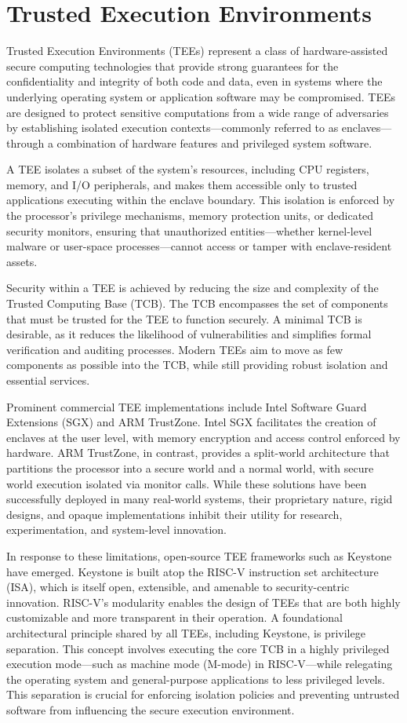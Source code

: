 \section{Trusted Execution Environments}
Trusted Execution Environments (TEEs) represent a class of hardware-assisted secure computing technologies that provide strong guarantees for the confidentiality and integrity of both code and data, even in systems where the underlying operating system or application software may be compromised. TEEs are designed to protect sensitive computations from a wide range of adversaries by establishing isolated execution contexts—commonly referred to as enclaves—through a combination of hardware features and privileged system software.

A TEE isolates a subset of the system’s resources, including CPU registers, memory, and I/O peripherals, and makes them accessible only to trusted applications executing within the enclave boundary. This isolation is enforced by the processor’s privilege mechanisms, memory protection units, or dedicated security monitors, ensuring that unauthorized entities—whether kernel-level malware or user-space processes—cannot access or tamper with enclave-resident assets.

Security within a TEE is achieved by reducing the size and complexity of the Trusted Computing Base (TCB). The TCB encompasses the set of components that must be trusted for the TEE to function securely. A minimal TCB is desirable, as it reduces the likelihood of vulnerabilities and simplifies formal verification and auditing processes. Modern TEEs aim to move as few components as possible into the TCB, while still providing robust isolation and essential services.

Prominent commercial TEE implementations include Intel Software Guard Extensions (SGX) and ARM TrustZone. Intel SGX facilitates the creation of enclaves at the user level, with memory encryption and access control enforced by hardware. ARM TrustZone, in contrast, provides a split-world architecture that partitions the processor into a secure world and a normal world, with secure world execution isolated via monitor calls. While these solutions have been successfully deployed in many real-world systems, their proprietary nature, rigid designs, and opaque implementations inhibit their utility for research, experimentation, and system-level innovation.

In response to these limitations, open-source TEE frameworks such as Keystone have emerged. Keystone is built atop the RISC-V instruction set architecture (ISA), which is itself open, extensible, and amenable to security-centric innovation. RISC-V’s modularity enables the design of TEEs that are both highly customizable and more transparent in their operation. A foundational architectural principle shared by all TEEs, including Keystone, is privilege separation. This concept involves executing the core TCB in a highly privileged execution mode—such as machine mode (M-mode) in RISC-V—while relegating the operating system and general-purpose applications to less privileged levels. This separation is crucial for enforcing isolation policies and preventing untrusted software from influencing the secure execution environment.

